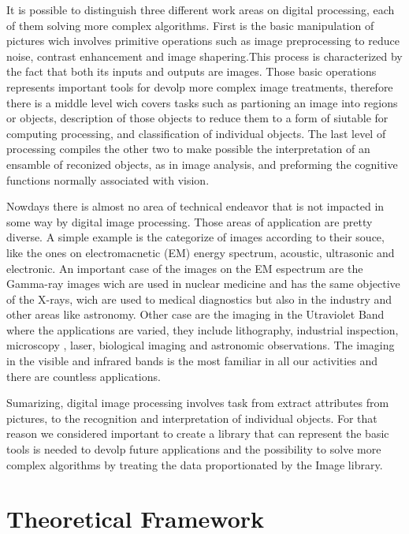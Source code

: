 \documentclass[a4paper]{article}
\begin{document}
It is possible to distinguish three different work areas on digital processing, each of them solving more complex algorithms. First is the basic manipulation of pictures wich involves primitive operations such as image preprocessing to reduce noise, contrast enhancement and image shapering.This process is characterized by the fact that both its inputs and outputs are images. Those basic operations represents important tools for devolp more complex image treatments, therefore there is a middle level wich covers tasks such as partioning an image into regions or objects, description of those objects to reduce them to a form of siutable for computing processing,  and classification of individual objects. The last level of processing compiles the other two to make possible the interpretation of an ensamble of reconized objects, as in image analysis, and preforming the cognitive functions normally associated with vision.

Nowdays there is almost no area of technical endeavor that is not impacted in some way by digital image processing. Those areas of application are pretty diverse. A simple example is the categorize of images according to their souce, like the ones on electromacnetic (EM) energy spectrum, acoustic, ultrasonic and electronic. 
An important case of the images on the EM espectrum are the Gamma-ray images wich are used in nuclear medicine and has the same objective of the X-rays, wich are used to medical diagnostics but also in the industry and other areas like astronomy. Other case are the imaging in the Utraviolet Band where the applications are varied, they include lithography, industrial inspection, microscopy , laser, biological imaging and astronomic observations. The imaging in the visible and infrared bands is the most familiar in all our activities and there are countless applications.

Sumarizing, digital image processing involves task from extract attributes from pictures, to the recognition and interpretation of individual objects. For that reason we considered important to create a library that can represent the basic tools is needed to devolp future applications and the possibility to solve more complex algorithms by treating the data proportionated by the Image library. 



\section{Theoretical Framework}
\end{document}
